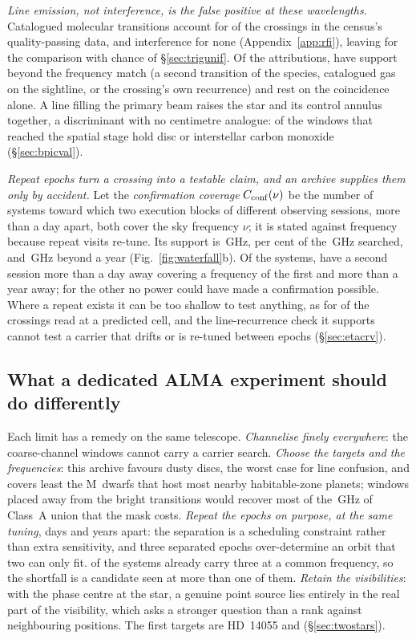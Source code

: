 \emph{Line emission, not interference, is the false positive at these
wavelengths.} Catalogued molecular transitions account for \CsNAttrQp{} of the
\CsNCrossQp{} crossings in the census's quality-passing data, and interference
for none (Appendix~\ref{app:rfi}), leaving \CsNUnattrQp{} for the comparison
with chance of \S\ref{sec:trigunif}. Of the attributions, \LnAttrSupp{} have
support beyond the frequency match (a second transition of the species,
catalogued gas on the sightline, or the crossing's own recurrence) and
\LnAttrCoincWord{} rest on the coincidence alone. A line filling the primary beam raises the star
and its control annulus together, a discriminant with no centimetre analogue:
\DiscFpWin{} of the \DiscFpOfFlags{} windows that reached the spatial stage
hold disc or interstellar carbon monoxide (\S\ref{sec:bpicval}).

\emph{Repeat epochs turn a crossing into a testable claim, and an archive
supplies them only by accident.} Let the \emph{confirmation coverage}
$C_{\rm conf}(\nu)$ be the number of systems toward which two execution blocks
of different observing sessions, more than a day apart, both cover the sky
frequency $\nu$; it is stated against frequency because repeat visits re-tune.
Its support is \CvConfGHzDay\,GHz, \CvConfPctDay{} per cent of the
\CvUnionA\,GHz searched, and \CvConfGHzYr\,GHz beyond a year
(Fig.~\ref{fig:waterfall}b). Of the \NSysClassA{} systems, \ZcConfSysDay{} have
a second session more than a day away covering a frequency of the first and
\ZcConfSysYr{} more than a year away; for the other \ZcNoRepSys{} no power
could have made a confirmation possible. Where a repeat exists it can be too
shallow to test anything, as for \HjNPowerLo{} of the \RcNExcl{} crossings read
at a predicted cell, and the line-recurrence check it supports cannot test a
carrier that drifts or is re-tuned between epochs (\S\ref{sec:etacrv}).

\subsection{What a dedicated ALMA experiment should do differently}
\label{sec:future}

Each limit has a remedy on the same telescope. \emph{Channelise finely
everywhere}: the \NCoarse{} coarse-channel windows cannot carry a carrier
search. \emph{Choose the targets and the frequencies}: this archive favours
dusty discs, the worst case for line confusion, and covers least the M~dwarfs
that host most nearby habitable-zone planets; windows placed away from the bright transitions would recover most of the
\MkMaskAGHz\,GHz of Class~A union that the mask costs. \emph{Repeat the epochs
on purpose, at the same tuning}, days and years apart: the separation is a
scheduling constraint rather than extra sensitivity, and three separated epochs
over-determine an orbit that two can only fit. \PaNSysThree{} of the
\NSysClassA{} systems already carry three at a common frequency, so the
shortfall is a candidate seen at more than one of them. \emph{Retain the
visibilities}: with the phase centre at the star, a genuine point source lies
entirely in the real part of the visibility, which asks a stronger question
than a rank against neighbouring positions. The first targets are HD~14055 and
\BkAlmaName{} (\S\ref{sec:twostars}).
